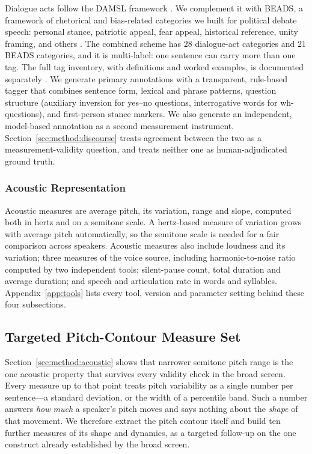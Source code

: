 \documentclass[pdflatex,sn-mathphys-num]{sn-jnl}%
\begin{document}
Dialogue acts follow the DAMSL framework \cite{core1997damsl}. We
complement it with BEADS, a framework of rhetorical and bias-related
categories we built for political debate speech: personal stance,
patriotic appeal, fear appeal, historical reference, unity framing, and
others \cite{prahallad2025beads}. The combined scheme has $28$ dialogue-act
categories and $21$ BEADS categories, and it is multi-label: one sentence
can carry more than one tag. The full tag inventory, with definitions and
worked examples, is documented separately \cite{prahallad2025beads}. We
generate primary annotations with a transparent, rule-based tagger that
combines sentence form, lexical and phrase patterns, question structure
(auxiliary inversion for yes--no questions, interrogative words for
wh-questions), and first-person stance markers. We also generate an
independent, model-based annotation as a second measurement instrument.
Section~\ref{sec:method:discourse} treats agreement between the two as a
measurement-validity question, and treats neither one as
human-adjudicated ground truth.

\subsubsection{Acoustic Representation}
\label{sec:method:acoustic-rep}

Acoustic measures are average pitch, its variation, range and slope,
computed both in hertz and on a semitone scale. A hertz-based measure of
variation grows with average pitch automatically, so the semitone scale is
needed for a fair comparison across speakers. Acoustic measures also
include loudness and its variation; three measures of the voice source,
including harmonic-to-noise ratio computed by two independent tools;
silent-pause count, total duration and average duration; and speech and
articulation rate in words and syllables. Appendix~\ref{app:tools} lists
every tool, version and parameter setting behind these four subsections.

\subsection{Targeted Pitch-Contour Measure Set}
\label{sec:method:pitch:extract}

Section~\ref{sec:method:acoustic} shows that narrower semitone pitch range is
the one acoustic property that survives every validity check in the broad
screen. Every measure up to that point treats pitch variability as a single
number per sentence---a standard deviation, or the width of a percentile
band. Such a number answers \emph{how much} a speaker's pitch moves and says
nothing about the \emph{shape} of that movement. We therefore extract the
pitch contour itself and build ten further measures of its shape and
dynamics, as a targeted follow-up on the one construct already established
by the broad screen.
\end{document}

